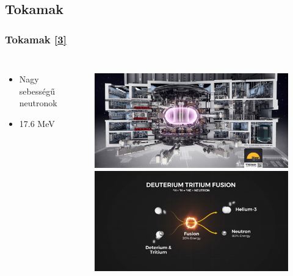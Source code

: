 \documentclass{beamer}
\begin{document}
\subsection{Tokamak}
\begin{frame}
    \frametitle{Tokamak \hyperlink{3}{\small[3]}}
    \begin{columns}
        \begin{itemize}
            \item Nagy sebességű neutronok
            \item 17.6 MeV
        \end{itemize}
        \begin{figure}
            \includegraphics[scale=0.043]{iter.jpeg}
            \includegraphics[scale=0.135]{deut_trit_v2.png}
        \end{figure}  
    \end{columns}
   
\end{frame}
\end{document}
